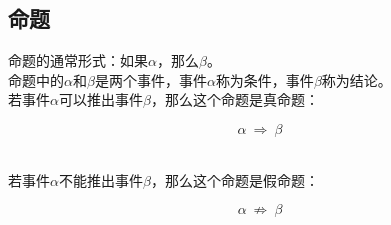 \documentclass[UTF8]{ctexart}
\begin{document}
\newpage

\subsection{命题}
    命题的通常形式：如果$\alpha$，那么$\beta$。\\[3mm]
    命题中的$\alpha$和$\beta$是两个事件，事件$\alpha$称为条件，事件$\beta$称为结论。\\[3mm]
    若事件$\alpha$可以推出事件$\beta$，那么这个命题是真命题：
    \begin{large}
        \begin{equation*}
            \alpha~\Longrightarrow~\beta
        \end{equation*}
    \end{large}\\
    若事件$\alpha$不能推出事件$\beta$，那么这个命题是假命题：
    \begin{large}
        \begin{equation*}
            \alpha~\not\Longrightarrow~\beta
        \end{equation*}
    \end{large}\vspace{-15pt}
\end{document}
